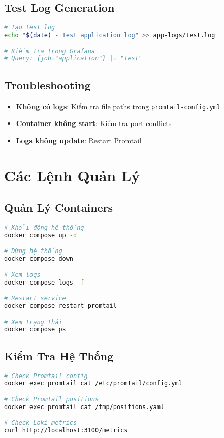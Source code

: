 \documentclass[a4paper,12pt]{article}
\begin{document}
\subsection{Test Log Generation}

\begin{lstlisting}[language=bash]
# Tạo test log
echo "$(date) - Test application log" >> app-logs/test.log

# Kiểm tra trong Grafana
# Query: {job="application"} |= "Test"
\end{lstlisting}

\subsection{Troubleshooting}

\begin{itemize}
    \item \textbf{Không có logs}: Kiểm tra file paths trong \texttt{promtail-config.yml}
    \item \textbf{Container không start}: Kiểm tra port conflicts
    \item \textbf{Logs không update}: Restart Promtail
\end{itemize}

\section{Các Lệnh Quản Lý}

\subsection{Quản Lý Containers}

\begin{lstlisting}[language=bash]
# Khởi động hệ thống
docker compose up -d

# Dừng hệ thống
docker compose down

# Xem logs
docker compose logs -f

# Restart service
docker compose restart promtail

# Xem trạng thái
docker compose ps
\end{lstlisting}

\subsection{Kiểm Tra Hệ Thống}

\begin{lstlisting}[language=bash]
# Check Promtail config
docker exec promtail cat /etc/promtail/config.yml

# Check Promtail positions
docker exec promtail cat /tmp/positions.yaml

# Check Loki metrics
curl http://localhost:3100/metrics
\end{lstlisting}
\end{document}
